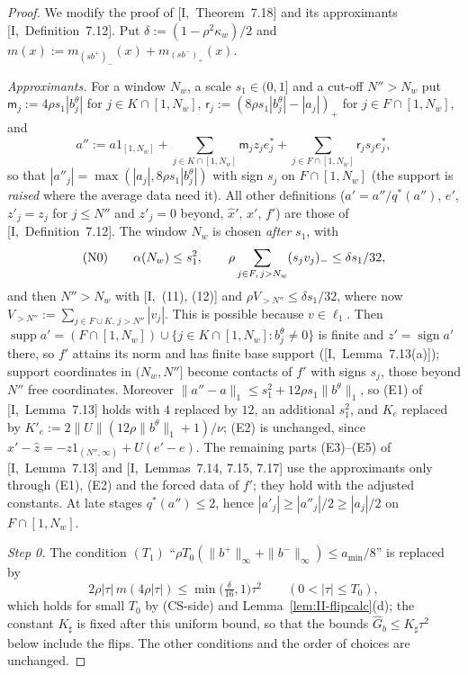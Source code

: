 \documentclass[10pt]{amsart}
\theoremstyle{definition}
\theoremstyle{remark}
\newcommand{\supp}{\operatorname{supp}}
\newcommand{\sgn}{\operatorname{sign}}
\newcommand{\zh}{\hat z}
\begin{document}
\begin{proof}
We modify the proof of [I,~Theorem~7.18] and its approximants
[I,~Definition~7.12].  Put $\delta:=(1-\rho^2\kappa_w)/2$ and
$m(x):=m_{(sb^+)_-}(x)+m_{(sb^-)_+}(x)$.

\emph{Approximants.}  For a window $N_w$, a scale $s_1\in(0,1]$ and a
cut-off $N''>N_w$ put $\mathsf m_j:=4\rho s_1|b^\theta_j|$ for $j\in
K\cap[1,N_w]$, $\mathsf r_j:=(8\rho s_1|b^\theta_j|-|a_j|)_+$ for $j\in
F\cap[1,N_w]$, and
\[
 a'':=a1_{[1,N_w]}+\sum_{j\in K\cap[1,N_w]}\mathsf m_jz_je^*_j+\sum_{j\in
 F\cap[1,N_w]}\mathsf r_js_je^*_j ,
\]
so that $|a''_j|=\max(|a_j|,8\rho s_1|b^\theta_j|)$ with sign $s_j$ on
$F\cap[1,N_w]$ (the support is \emph{raised} where the average data need
it).  All other definitions ($a'=a''/q^*(a'')$, $e'$, $z'_j=z_j$ for $j\le
N''$ and $z'_j=0$ beyond, $\hat x'$, $x'$, $f'$) are those of
[I,~Definition~7.12].  The window $N_w$ is chosen \emph{after} $s_1$, with
\[
 \textup{(N0)}\qquad\alpha(N_w)\le s_1^2,\qquad\rho\sum_{j\in F,\,j>N_w}
 (s_jv_j)_-\le\delta s_1/32,
\]
and then $N''>N_w$ with [I,~(11), (12)] and $\rho V_{>N''}\le\delta s_1/32$,
where now $V_{>N''}:=\sum_{j\in F\cup K,\,j>N''}|v_j|$.  This is possible
because $v\in\ell_1$.  Then $\supp a'=(F\cap[1,N_w])\cup\{j\in K\cap[1,N_w]:
b^\theta_j\ne0\}$ is finite and $z'=\sgn a'$ there, so $f'$ attains its
norm and has finite base support ([I,~Lemma~7.13(a)]); support coordinates
in $(N_w,N'']$ become contacts of $f'$ with signs $s_j$, those beyond $N''$
free coordinates.  Moreover $\|a''-a\|_1\le s_1^2+12\rho s_1\|b^\theta\|_1$, so
(E1) of [I,~Lemma~7.13] holds with $4$ replaced by $12$, an additional $s_1^2$,
and $K_e$ replaced by $K'_e:=2\|U\|(12\rho\|b^\theta\|_1+1)/\nu$; (E2) is
unchanged, since $\hat x'-\zh=-z1_{(N'',\infty)}+U(e'-e)$.  The remaining
parts (E3)--(E5) of [I,~Lemma~7.13] and [I,~Lemmas~7.14, 7.15, 7.17] use the
approximants only through (E1), (E2) and the forced data of $f'$; they hold
with the adjusted constants.  At late stages $q^*(a'')\le2$, hence
$|a'_j|\ge|a''_j|/2\ge|a_j|/2$ on $F\cap[1,N_w]$.

\emph{Step 0.}  The condition $(T_1)$ ``$\rho T_0(\|b^+\|_\infty+
\|b^-\|_\infty)\le a_{\min}/8$'' is replaced by
\[
 2\rho|\tau|\,m(4\rho|\tau|)\le\min\big(\tfrac{\delta}{16},1\big)\tau^2
 \qquad(0<|\tau|\le T_0),
\]
which holds for small $T_0$ by (CS-side) and
Lemma~\ref{lem:II-flipcalc}(d); the constant $K_\sharp$ is fixed after this
uniform bound, so that the bounds $\hat G_b\le K_\sharp\tau^2$ below include
the flips.  The other conditions and the order of choices are unchanged.


\end{proof}
\end{document}
